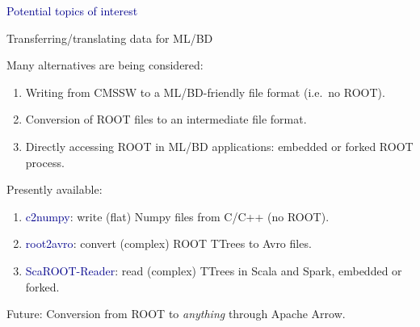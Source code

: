 \documentclass{beamer}
\begin{document}
\begin{frame}{}
\begin{center}
\Huge \textcolor{darkblue}{Potential topics of interest}
\end{center}
\end{frame}

\begin{frame}{Transferring/translating data for ML/BD}
\vspace{0.25 cm}
\begin{block}{Many alternatives are being considered:}
\begin{enumerate}
\item Writing from CMSSW to a ML/BD-friendly file format (i.e.\ no ROOT).
\item Conversion of ROOT files to an intermediate file format.
\item Directly accessing ROOT in ML/BD applications: embedded or forked ROOT process.
\end{enumerate}
\end{block}

\vspace{-0.25 cm}
\begin{block}{Presently available:}
\begin{enumerate}
\item \textcolor{darkblue}{c2numpy}: write (flat) Numpy files from C/C++ (no ROOT).
\item \textcolor{darkblue}{root2avro}: convert (complex) ROOT TTrees to Avro files.
\item \textcolor{darkblue}{ScaROOT-Reader}: read (complex) TTrees in Scala and Spark, embedded or forked.
\end{enumerate}
\end{block}

\vspace{-0.25 cm}
\begin{block}{Future:}
Conversion from ROOT to {\it anything} through Apache Arrow.
\end{block}
\end{frame}
\end{document}
